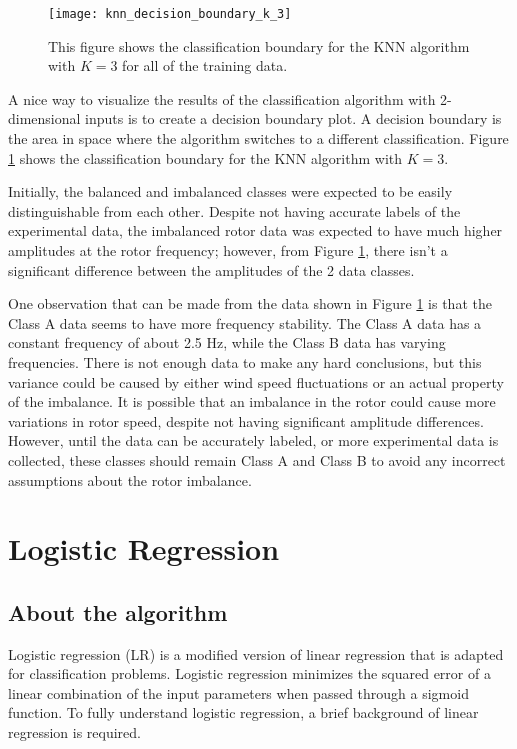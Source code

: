 \begin{figure}
	\centering
	\texttt{[image: knn\_decision\_boundary\_k\_3]}
	\decoRule
	\caption{This figure shows the classification boundary for the KNN algorithm with $K=3$ for all of the training data.}
	\label{fig:knn_decision_boundary_k_3}
\end{figure}

A nice way to visualize the results of the classification algorithm with 2-dimensional inputs is to create a decision boundary plot.  A decision boundary is the area in space where the algorithm switches to a different classification.  Figure \ref{fig:knn_decision_boundary_k_3} shows the classification boundary for the KNN algorithm with $K=3$.

Initially, the balanced and imbalanced classes were expected to be easily distinguishable from each other.  Despite not having accurate labels of the experimental data, the imbalanced rotor data was expected to have much higher amplitudes at the rotor frequency; however, from Figure \ref{fig:knn_decision_boundary_k_3}, there isn't a significant difference between the amplitudes of the 2 data classes.

One observation that can be made from the data shown in Figure \ref{fig:knn_decision_boundary_k_3} is that the Class A data seems to have more frequency stability.  The Class A data has a constant frequency of about 2.5 Hz, while the Class B data has varying frequencies.  There is not enough data to make any hard conclusions, but this variance could be caused by either wind speed fluctuations or an actual property of the imbalance.  It is possible that an imbalance in the rotor could cause more variations in rotor speed, despite not having significant amplitude differences.  However, until the data can be accurately labeled, or more experimental data is collected, these classes should remain Class A and Class B to avoid any incorrect assumptions about the rotor imbalance.

\section{Logistic Regression}
\subsection{About the algorithm}
Logistic regression (LR) is a modified version of linear regression that is adapted for classification problems.  Logistic regression minimizes the squared error of a linear combination of the input parameters when passed through a sigmoid function.  To fully understand logistic regression, a brief background of linear regression is required. 

